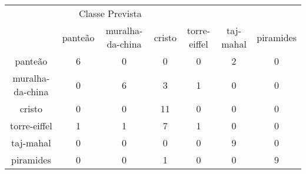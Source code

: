 \begin{tabular}{|c|c|c|c|c|c|c|}
\hline
\multicolumn{5}{|c|}{Classe Prevista}\\
 & panteão & muralha-da-china & cristo & torre-eiffel & taj-mahal & piramides\\
panteão & 6 & 0 & 0 & 0 & 2 & 0\\
muralha-da-china & 0 & 6 & 3 & 1 & 0 & 0\\
cristo & 0 & 0 & 11 & 0 & 0 & 0\\
torre-eiffel & 1 & 1 & 7 & 1 & 0 & 0\\
taj-mahal & 0 & 0 & 0 & 0 & 9 & 0\\
piramides & 0 & 0 & 1 & 0 & 0 & 9\\
\end{tabular}
